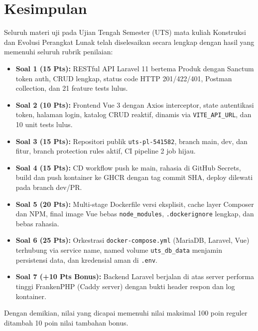 \documentclass[a4paper,oneside,11pt]{book}
\begin{document}
\chapter{Kesimpulan}

Seluruh materi uji pada Ujian Tengah Semester (UTS) mata kuliah Konstruksi dan Evolusi Perangkat Lunak telah diselesaikan secara lengkap dengan hasil yang memenuhi seluruh rubrik penilaian:
\begin{itemize}
    \item \textbf{Soal 1 (15 Pts):} RESTful API Laravel 11 bertema Produk dengan Sanctum token auth, CRUD lengkap, status code HTTP 201/422/401, Postman collection, dan 21 feature tests lulus.
    \item \textbf{Soal 2 (10 Pts):} Frontend Vue 3 dengan Axios interceptor, state autentikasi token, halaman login, katalog CRUD reaktif, dinamis via \texttt{VITE\_API\_URL}, dan 10 unit tests lulus.
    \item \textbf{Soal 3 (15 Pts):} Repositori publik \texttt{uts-pl-541582}, branch main, dev, dan fitur, branch protection rules aktif, CI pipeline 2 job hijau.
    \item \textbf{Soal 4 (15 Pts):} CD workflow push ke main, rahasia di GitHub Secrets, build dan push kontainer ke GHCR dengan tag commit SHA, deploy dilewati pada branch dev/PR.
    \item \textbf{Soal 5 (20 Pts):} Multi-stage Dockerfile versi eksplisit, cache layer Composer dan NPM, final image Vue bebas \texttt{node\_modules}, \texttt{.dockerignore} lengkap, dan bebas rahasia.
    \item \textbf{Soal 6 (25 Pts):} Orkestrasi \texttt{docker-compose.yml} (MariaDB, Laravel, Vue) terhubung via service name, named volume \texttt{uts\_db\_data} menjamin persistensi data, dan kredensial aman di \texttt{.env}.
    \item \textbf{Soal 7 (+10 Pts Bonus):} Backend Laravel berjalan di atas server performa tinggi FrankenPHP (Caddy server) dengan bukti header respon dan log kontainer.
\end{itemize}

Dengan demikian, nilai yang dicapai memenuhi nilai maksimal 100 poin reguler ditambah 10 poin nilai tambahan bonus.
\end{document}
